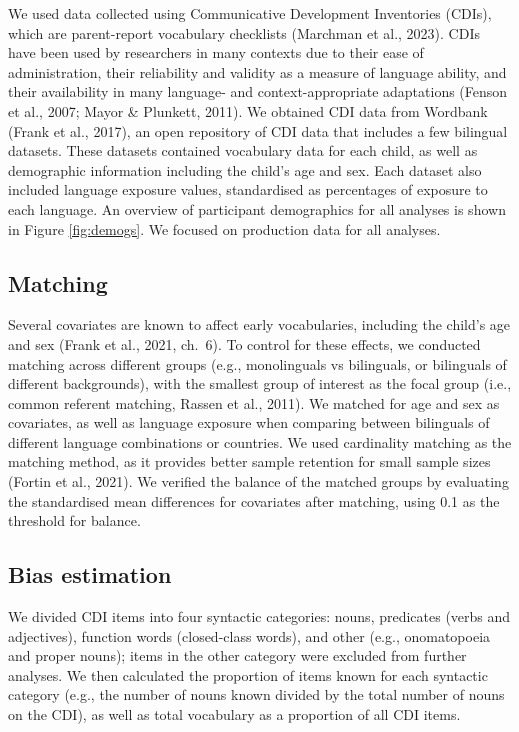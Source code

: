 \documentclass[10pt, letterpaper]{article}
\begin{document}
We used data collected using Communicative Development Inventories
(CDIs), which are parent-report vocabulary checklists (Marchman et al.,
2023). CDIs have been used by researchers in many contexts due to their
ease of administration, their reliability and validity as a measure of
language ability, and their availability in many language- and
context-appropriate adaptations (Fenson et al., 2007; Mayor \& Plunkett,
2011). We obtained CDI data from Wordbank (Frank et al., 2017), an open
repository of CDI data that includes a few bilingual datasets. These
datasets contained vocabulary data for each child, as well as
demographic information including the child's age and sex. Each dataset
also included language exposure values, standardised as percentages of
exposure to each language. An overview of participant demographics for
all analyses is shown in Figure \ref{fig:demogs}. We focused on
production data for all analyses.

\subsection{Matching}\label{matching}

Several covariates are known to affect early vocabularies, including the
child's age and sex (Frank et al., 2021, ch.~6). To control for these
effects, we conducted matching across different groups (e.g.,
monolinguals vs bilinguals, or bilinguals of different backgrounds),
with the smallest group of interest as the focal group (i.e., common
referent matching, Rassen et al., 2011). We matched for age and sex as
covariates, as well as language exposure when comparing between
bilinguals of different language combinations or countries. We used
cardinality matching as the matching method, as it provides better
sample retention for small sample sizes (Fortin et al., 2021). We
verified the balance of the matched groups by evaluating the
standardised mean differences for covariates after matching, using 0.1
as the threshold for balance.

\subsection{Bias estimation}\label{bias-estimation}

We divided CDI items into four syntactic categories: nouns, predicates
(verbs and adjectives), function words (closed-class words), and other
(e.g., onomatopoeia and proper nouns); items in the other category were
excluded from further analyses. We then calculated the proportion of
items known for each syntactic category (e.g., the number of nouns known
divided by the total number of nouns on the CDI), as well as total
vocabulary as a proportion of all CDI items.
\end{document}
